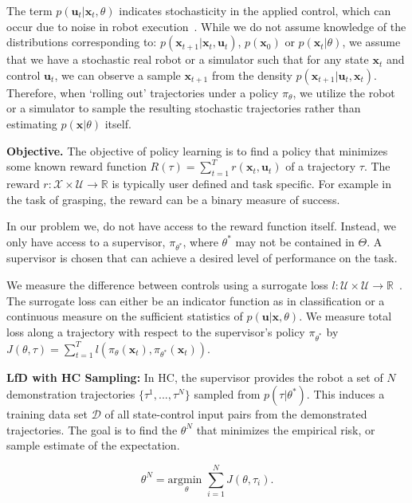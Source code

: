 \documentclass[10pt, conference]{ieeeconf}      %
\newcommand{\bu}{\mathbf{u}}
\newcommand{\bx}{\mathbf{x}}
\newcommand{\ns}{HC }
\begin{document}
The term $p(\bu_t|\bx_t,\theta)$ indicates stochasticity in the applied control, which can occur due to noise in robot execution~\cite{mahler2014learning}.
While we do not assume knowledge of the distributions corresponding to: $p(\bx_{t+1}|\bx_t,\bu_t)$, $p(\bx_0)$ or $p(\bx_t|
\theta)$, we assume that we have a stochastic real robot or a simulator such that for any state
$\bx_t$ and control $\bu_t$, we can observe a sample $\bx_{t+1}$ from the density $p(\bx_{t+1}|\bu_t,\bx_t)$. 
Therefore, when `rolling out' trajectories under a policy
$\pi_{\theta}$, we utilize the robot or a simulator to sample the resulting stochastic trajectories rather than
estimating $p(\bx|\theta)$ itself.


\noindent\textbf{Objective.} The objective of policy learning is to find a policy that minimizes some known reward function $R(\tau) = \sum^T_{t=1} r(\bx_t,\bu_t)$ of a trajectory $\tau$. The reward $r:\mathcal{X}\times \mathcal{U}\to \mathbb{R}$ is typically user defined and task specific. 
For example in the task of grasping, the reward can be a binary measure of success.

In our problem we,  do not have access to the reward function itself. Instead, we only have access to 
a supervisor, $\pi_{\theta^*}$, where $\theta^*$ may not be contained in $\Theta$. A supervisor is chosen that can achieve a desired level of performance on the task.

We measure the difference between controls using a surrogate loss $l : \mathcal{U} \times \mathcal{U} \rightarrow \mathbb{R}$~\cite{ross2010reduction,ross2010efficient}.
The surrogate loss can either be an indicator function as in classification or a continuous measure on the sufficient statistics of $p(\bu|\bx,\theta)$.
We measure total loss along a trajectory with respect to the supervisor's policy $\pi_{\theta^*}$ by $J(\theta, \tau) = \sum^T_{t=1} l(\pi_{\theta}(\bx_{t}),\pi_{\theta^*}(\bx_{t}))$.

\noindent \textbf{LfD with \ns Sampling:} In HC, the supervisor provides the robot a set of $N$ demonstration trajectories $\lbrace \tau^1,...,\tau^N \rbrace$ sampled from $p(\tau | \theta^*)$.
This induces a training data set $\mathcal{D}$ of all state-control input pairs from the demonstrated trajectories.
The goal is to find the $\theta^N$ that minimizes the empirical risk, or sample estimate of the expectation. 


\begin{equation}\label{eq:main_obj}
\theta^N = \underset{\theta}{\mbox{argmin }} \sum \limits_{i=1}^N J(\theta, \tau_i).
\end{equation}
\end{document}
